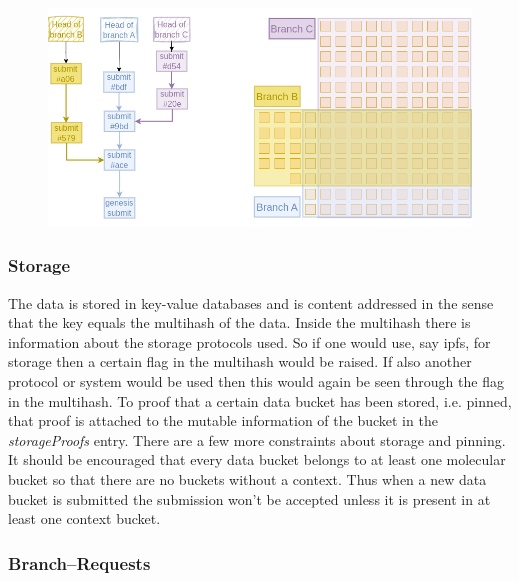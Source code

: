 \documentclass[14pt]{article}
\begin{document}
\begin{figure}[b!]
  \begin{center}
    \includegraphics[width=1.0\textwidth]{img/BranchBucketRelationV2.png}
\end{center}
 \caption{}
 \label{fig:branchbucketrel}
\end{figure}

\subsubsection{Storage}
\label{ssc:storage}

The data is stored in key-value databases and is content addressed in the sense that the key equals the multihash of the data. Inside the multihash there is information about the storage protocols used. So if one would use, say ipfs, for storage then a certain flag in the multihash would be raised. If also another protocol or system would be used then this would again be seen through the flag in the multihash. To proof that a certain data bucket has been stored, i.e. pinned, that proof is attached to the mutable information of the bucket in the \textit{storageProofs} entry. There are a few more constraints about storage and pinning. It should be encouraged that every data bucket belongs to at least one molecular bucket so that there are no buckets without a context. Thus when a new data bucket is submitted the submission won't be accepted unless it is present in at least one context bucket.

\subsubsection{Branch--Requests}
\end{document}
